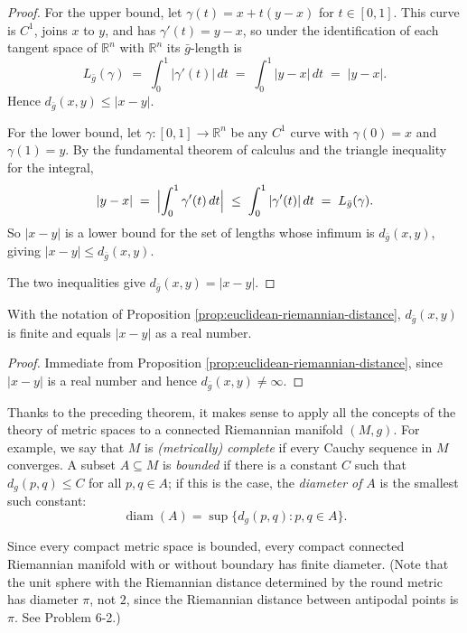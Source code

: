 \begin{proof}
\leanok
{}
For the upper bound, let $\gamma(t) = x + t(y-x)$ for $t \in [0,1]$. This curve is $C^1$, joins
$x$ to $y$, and has $\gamma'(t) = y - x$, so under the identification of each tangent space of
$\mathbb{R}^n$ with $\mathbb{R}^n$ its $\bar g$-length is
\[
  L_{\bar g}(\gamma) \;=\; \int_0^1 |\gamma'(t)| \, dt \;=\; \int_0^1 |y-x| \, dt \;=\; |y-x| .
\]
Hence $d_{\bar g}(x,y) \le |x-y|$.

For the lower bound, let $\gamma : [0,1] \to \mathbb{R}^n$ be any $C^1$ curve with
$\gamma(0) = x$ and $\gamma(1) = y$. By the fundamental theorem of calculus and the triangle
inequality for the integral,
\[
  |y - x| \;=\; \Bigl| \int_0^1 \gamma'(t) \, dt \Bigr| \;\le\; \int_0^1 |\gamma'(t)| \, dt
    \;=\; L_{\bar g}(\gamma) .
\]
So $|x-y|$ is a lower bound for the set of lengths whose infimum is $d_{\bar g}(x,y)$, giving
$|x-y| \le d_{\bar g}(x,y)$.

The two inequalities give $d_{\bar g}(x,y) = |x-y|$.
\end{proof}

\begin{lemma}
\label{lem:euclidean-riemannian-distance-real}
\leanok
{}
With the notation of Proposition \ref{prop:euclidean-riemannian-distance}, $d_{\bar g}(x,y)$ is
finite and equals $|x-y|$ as a real number.
\end{lemma}

\begin{proof}
\leanok
{}
Immediate from Proposition \ref{prop:euclidean-riemannian-distance}, since $|x-y|$ is a real
number and hence $d_{\bar g}(x,y) \ne \infty$.
\end{proof}

Thanks to the preceding theorem, it makes sense to apply all the concepts of the theory of metric spaces to a connected Riemannian manifold $(M,g)$. For example, we say that $M$ is \textit{(metrically) complete} if every Cauchy sequence in $M$ converges. A subset $A \subseteq M$ is \textit{bounded} if there is a constant $C$ such that $d_g(p,q) \leq C$ for all $p,q \in A$; if this is the case, the \textit{diameter of } $A$ is the smallest such constant:
\[
\operatorname{diam}(A) = \sup\{d_g(p,q) : p,q \in A\}.
\]

Since every compact metric space is bounded, every compact connected Riemannian manifold with or without boundary has finite diameter. (Note that the unit sphere with the Riemannian distance determined by the round metric has diameter $\pi$, not $2$, since the Riemannian distance between antipodal points is $\pi$. See Problem 6-2.)

